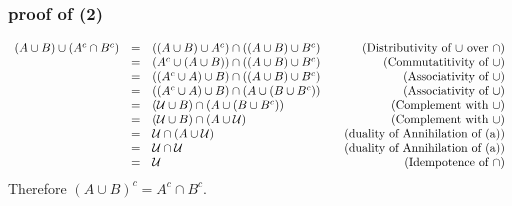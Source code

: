 \documentclass[]{article}
\begin{document}
\begin{spacing}{1.5}
\subsubsection*{proof of (2)}
\[\begin{array}{rclr}
	(A \cup B) \cup (A^c \cap B^c) &=& ((A \cup B) \cup A^c) \cap ((A \cup B) \cup B^c) &\quad\text{(Distributivity of $ \cup $ over $ \cap $)}\\
	&=& (A^c \cup (A \cup B)) \cap ((A \cup B) \cup B^c) &\quad\text{(Commutatitivity of $ \cup $)}\\
	&=& ((A^c \cup A) \cup B) \cap ((A \cup B) \cup B^c) &\quad\text{(Associativity of $ \cup $)}\\
	&=& ((A^c \cup A) \cup B) \cap (A \cup (B \cup B^c)) &\quad\text{(Associativity of $ \cup $)}\\
	&=& (\mathcal{U} \cup B) \cap (A \cup (B \cup B^c)) &\quad\text{(Complement with $ \cup $)}\\
	&=& (\mathcal{U} \cup B) \cap (A \cup \mathcal{U}) &\quad\text{(Complement with $ \cup $)}\\
	&=& \mathcal{U}  \cap (A \cup \mathcal{U}) &\quad\text{(duality of Annihilation of (a))}\\
	&=& \mathcal{U}  \cap  \mathcal{U} &\quad\text{(duality of Annihilation of (a))}\\
	&=& \mathcal{U} &\quad\text{(Idempotence of $ \cap $)}
\end{array}\]
Therefore $ (A \cup B)^{c} = A^c \cap B^c $.



\end{spacing}
\end{document}
